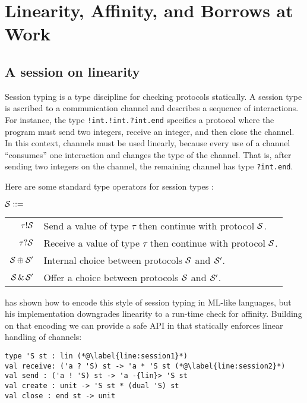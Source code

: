 \section{Linearity, Affinity, and Borrows at Work}
\label{motivation}

\subsection{A session on linearity}
\label{sec:session-linearity}

Session typing \cite{Honda1993,DBLP:conf/esop/HondaVK98} is a type
discipline for checking protocols statically. A session type is
ascribed to a communication channel and describes
a sequence of interactions. For instance, the type
\lstinline{!int.!int.?int.end} specifies a protocol
where the program must send two integers, receive an integer, and then
close the channel. 
%
In this context, channels must be used linearly, because every use of
a channel ``consumes'' one interaction and  changes the type of the
channel. That is, after sending two integers on the channel,
the remaining channel has type \lstinline{?int.end}.

Here are some standard type operators for session types \SType:
\begin{center}
  $\mathcal S ::=$
  \begin{tabular}[t]{rl}
    $\tau ! \mathcal S$ & Send a value of type $\tau$ then continue with protocol $\mathcal S$.\\
    $\tau ? \mathcal S$& Receive a value of type $\tau$ then continue with protocol $\mathcal S$.\\
    $\mathcal S \oplus \mathcal S'$& Internal choice between protocols $\mathcal S$ and $\mathcal S'$.\\
    $\mathcal S \operatorname{\&} \mathcal S'$
                    & Offer a choice between protocols $\mathcal S$ and $\mathcal S'$. 
  \end{tabular}
\end{center}

\citet{DBLP:journals/jfp/Padovani17}  has shown how to encode this
style of session typing in ML-like languages, but his implementation
downgrades linearity to a run-time check for affinity. Building on that
encoding we can provide a safe API in \lang that statically enforces
linear handling of channels:
%
\begin{lstlisting}
type 'S st : lin (*@\label{line:session1}*)
val receive: ('a ? 'S) st -> 'a * 'S st (*@\label{line:session2}*)
val send : ('a ! 'S) st -> 'a -{lin}> 'S st
val create : unit -> 'S st * (dual 'S) st
val close : end st -> unit
\end{lstlisting}

